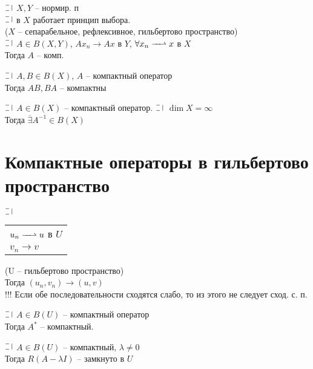 \begin{theorem}[Th2]
  $\letus$ $X, Y$ -- нормир. п\\
  $\letus$ в $X$ работает принцип выбора. \\
  ($X$ -- сепарабельное, рефлексивное, гильбертово пространство)\\
  $\letus$ $A \in B(X, Y)$, $Ax_n \longrightarrow Ax$ в $Y$, $\forall x_n \weakconv x$ в $X$\\ 
  Тогда $A$ -- комп. 
\end{theorem}

\begin{theorem}[Th3]
  $\letus$ $A, B \in B(X)$, $A$ -- компактный оператор\\
  Тогда $AB, BA$ -- компактны
\end{theorem}

\begin{sled}[Th 3]
  $\letus$ $A\in B(X)$ -- компактный оператор. $\letus$ $\dim X = \infty$ \\
  Тогда $\overline{\exists} A^{-1} \in B(X)$
\end{sled}

\section*{Компактные операторы в гильбертово пространство}

\begin{lemma}
  $\letus$ \begin{tabular}[t]{l}$u_n \weakconv u$ в $U$\\$v_n \longrightarrow v$\end{tabular} (U -- гильбертово пространство)\\
  Тогда $(u_n, v_n) \longrightarrow (u, v)$\\
  !!! Если обе последовательности сходятся слабо, то из этого не следует сход. с. п.
\end{lemma}

\begin{utv}
  $\letus$ $A \in B(U)$ -- компактный оператор\\
  Тогда $A^*$ -- компактный.
\end{utv}

\begin{lemma}[1]
  $\letus$ $A \in B(U)$ -- компактный, $\lambda \not = 0$\\
  Тогда $R(A - \lambda I)$ -- замкнуто в $U$
\end{lemma}

